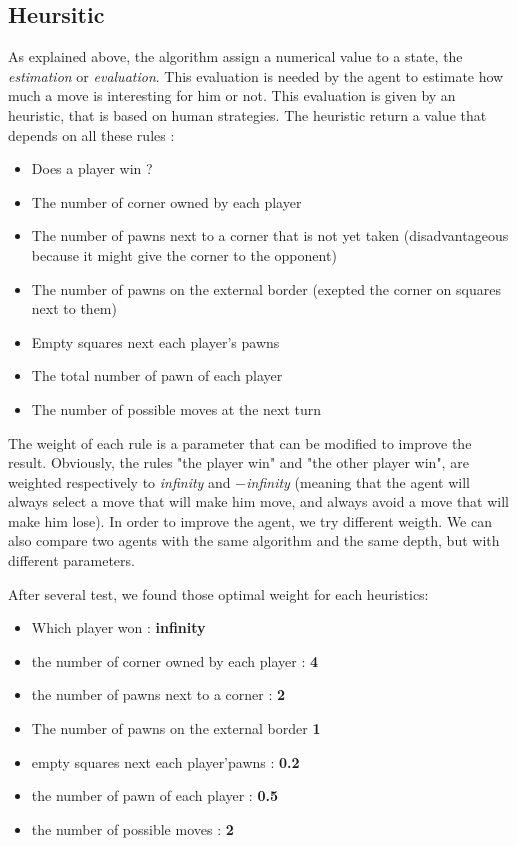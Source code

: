 \documentclass{article}
\begin{document}
\subsection{Heursitic}\label{sec:heuristic}
As explained above, the algorithm assign a numerical value to a state, the \textit{estimation} or \textit{evaluation}. This evaluation is needed by the agent to estimate how much a move is interesting for him %
or not. This evaluation is given by an heuristic, that is based on human strategies.
The heuristic return a value that depends on all these rules :
\begin{itemize}
    \item Does a player win ?
    \item The number of corner owned by each player
    \item The number of pawns next to a corner that is not yet taken (disadvantageous because it might give the corner to the opponent)
    \item The number of pawns on the external border (exepted the corner on squares next to them)
    \item Empty squares next each player's pawns
    \item The total number of pawn of each player
    \item The number of possible moves at the next turn
\end{itemize}
The weight of each rule is a parameter that can be modified to improve the result. Obviously, the rules "the player win" and "the other player win", are weighted respectively
to \textit{infinity} and $-$\textit{infinity} (meaning that the agent will always select a move that will make him move, and always avoid a move that will make him lose).
In order to improve the agent, we try different weigth. We can also compare two agents with the same algorithm and the same depth, but with different parameters.




 \newline
 After several test, we found those optimal weight for each heuristics:
\begin{itemize}
    \item Which player won : \textbf{infinity}
    \item the number of corner owned by each player : \textbf{4}
    \item the number of pawns next to a corner : \textbf{2}
    \item The number of pawns on the external border \textbf{1}
    \item empty squares next each player'pawns : \textbf{0.2}
    \item the number of pawn of each player : \textbf{0.5}
    \item the number of possible moves : \textbf{2}

\end{itemize}
\end{document}
